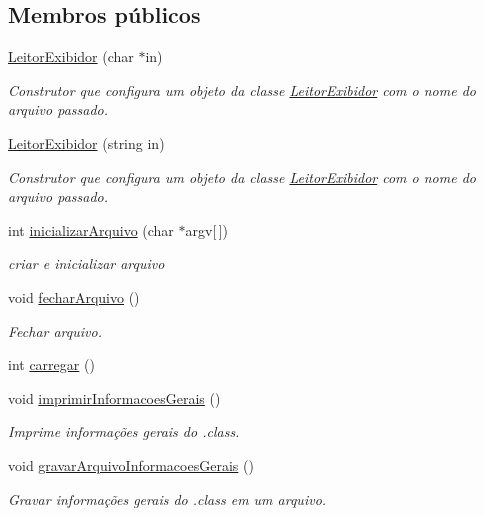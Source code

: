 \subsection*{Membros públicos}
\begin{DoxyCompactItemize}
\item 
\hyperlink{classLeitorExibidor_aa1ffcfe21da762169b16483e4d30f683}{Leitor\+Exibidor} (char $\ast$in)
\begin{DoxyCompactList}\small\item\em Construtor que configura um objeto da classe \hyperlink{classLeitorExibidor}{Leitor\+Exibidor} com o nome do arquivo passado. \end{DoxyCompactList}\item 
\hyperlink{classLeitorExibidor_a10fd8d8b58be93148ff4d527c3ab5bd3}{Leitor\+Exibidor} (string in)
\begin{DoxyCompactList}\small\item\em Construtor que configura um objeto da classe \hyperlink{classLeitorExibidor}{Leitor\+Exibidor} com o nome do arquivo passado. \end{DoxyCompactList}\item 
int \hyperlink{classLeitorExibidor_a185520372593c9ee066d72c67e4a38e6}{inicializar\+Arquivo} (char $\ast$argv\mbox{[}$\,$\mbox{]})
\begin{DoxyCompactList}\small\item\em criar e inicializar arquivo \end{DoxyCompactList}\item 
void \hyperlink{classLeitorExibidor_a16868d53a83dca37586819aadeb7f0eb}{fechar\+Arquivo} ()
\begin{DoxyCompactList}\small\item\em Fechar arquivo. \end{DoxyCompactList}\item 
int \hyperlink{classLeitorExibidor_a493a9aed1941a4f01c611a2deeb37f8d}{carregar} ()
\item 
void \hyperlink{classLeitorExibidor_a338627a08235ffe50ede3d9e023c1238}{imprimir\+Informacoes\+Gerais} ()
\begin{DoxyCompactList}\small\item\em Imprime informações gerais do .class. \end{DoxyCompactList}\item 
void \hyperlink{classLeitorExibidor_ab65aba73916cc733df269b3033522a3c}{gravar\+Arquivo\+Informacoes\+Gerais} ()
\begin{DoxyCompactList}\small\item\em Gravar informações gerais do .class em um arquivo. \end{DoxyCompactList}\item 

\end{DoxyCompactItemize}
